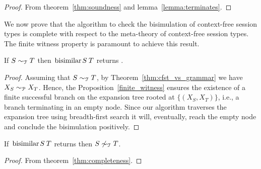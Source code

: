 \begin{proof}
	From theorem~\ref{thm:soundness} and lemma~\ref{lemma:terminates}.
\end{proof}
 
We now prove that the algorithm to check the bisimulation of context-free session 
types is complete with respect to the meta-theory of context-free session
types. The finite witness property is paramount to achieve this result.

\begin{theorem}
\label{thm:completeness}
  If $S \sim_\mathcal T T$ then $\bisimf S T$ returns
  .
\end{theorem}

\begin{proof}
  Assuming that $S \sim_\mathcal T T$, by Theorem~\ref{thm:cfst_vs_grammar}
  we have $X_{S} \sim_\mathcal P X_{T}$.  Hence, the Proposition~\ref{finite_witness}
  ensures the existence of a finite successful branch on the
  expansion tree rooted at $\{(X_{S},X_{T})\}$, i.e., a branch
  terminating in an empty node.  Since our algorithm traverses the
  expansion tree using breadth-first search it will, eventually, reach
  the empty node and conclude the bisimulation positively.
\end{proof}

\begin{corollary}
	If $\bisimf ST$ returns  then $S\not\sim_\mathcal T T$.
\end{corollary}

\begin{proof}
	From theorem~\ref{thm:completeness}.
\end{proof}

